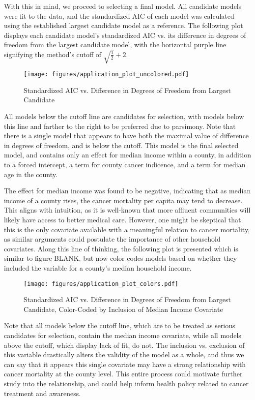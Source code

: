 		With this in mind, we proceed to selecting a final model. All candidate models were fit to the data, and the standardized AIC of each model was calculated
		using the established largest candidate model as a reference. The following plot displays each candidate model's standardized AIC vs. its difference in
		degrees of freedom from the largest candidate model, with the horizontal purple line signifying the method's cutoff of $\sqrt{\frac{1}{2}} + 2$.

		\begin{figure}[H]
			\centering
			\captionsetup{justification=centering}
			\texttt{[image: figures/application\_plot\_uncolored.pdf]}
			\caption{\label{fig:app_residual_plot} Standardized AIC vs. Difference in Degrees of Freedom from Largest Candidate}
		\end{figure}

		All models below the cutoff line are candidates for selection, with models below this line and farther to the right to be preferred due to parsimony. Note
		that there is a single model that appears to have both the maximal value of difference in degrees of freedom, and is below the cutoff. This model is the
		final selected model, and contains only an effect for median income within a county, in addition to a forced intercept, a term for county cancer indicence,
		and a term for median age in the county.
		
		The effect for median income was found to be negative, indicating that as median income of a county rises, the cancer mortality per capita may tend to
		decrease. This aligns with intuition, as it is well-known that more affluent communities will likely have access to better medical care. However, one
		might be skeptical that this is the only covariate available with a meaningful relation to cancer mortality, as similar arguments could postulate
		the importance of other household covariates. Along this line of thinking, the following plot is presented which is similar to figure BLANK, but now
		color codes models based on whether they included the variable for a county's median household income.

		\begin{figure}[H]
			\centering
			\captionsetup{justification=centering}
			\texttt{[image: figures/application\_plot\_colors.pdf]}
			\caption{\label{fig:app_residual_plot} Standardized AIC vs. Difference in Degrees of Freedom from Largest Candidate,
			Color-Coded by Inclusion of Median Income Covariate}
		\end{figure}

		Note that all models below the cutoff line, which are to be treated as serious candidates for selection, contain the median income covariate, while all models
		above the cutoff, which display lack of fit, do not. The inclusion vs. exclusion of this variable drastically alters the validity of the model as a whole, and
		thus we can say that it appears this single covariate may have a strong relationship with cancer mortality at the county level. This entire process could
		motivate further study into the relationship, and could help inform health policy related to cancer treatment and awareness.

